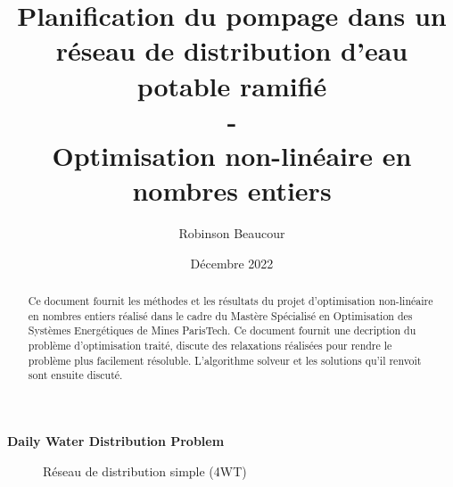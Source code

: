 \documentclass{article}
\title{Planification du pompage dans un réseau de distribution d'eau potable ramifié\\-\\Optimisation non-linéaire en nombres entiers}
\author{Robinson Beaucour}
\date{Décembre 2022}
\begin{document}
\maketitle

\vspace{2cm}

\begin{abstract}
    Ce document fournit les méthodes et les résultats du projet d'optimisation non-linéaire en nombres entiers réalisé dans le cadre du Mastère Spécialisé en Optimisation des Systèmes Energétiques de Mines ParisTech.
    Ce document fournit une decription du problème d'optimisation traité, discute des relaxations réalisées pour rendre le problème plus facilement résoluble. L'algorithme solveur et les solutions qu'il renvoit sont ensuite discuté.
\end{abstract}


\clearpage  

\begin{center}
    \large \textbf{Daily Water Distribution Problem}
\end{center}
\begin{figure}[h]
    \centering
    \caption{Réseau de distribution simple (4WT)}
\end{figure}
\end{document}
